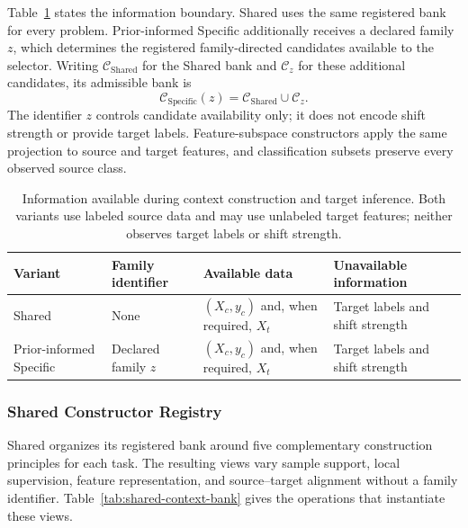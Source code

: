 Table~\ref{tab:context-information-interface} states the information boundary.
Shared uses the same registered bank for every problem.  Prior-informed
Specific additionally receives a declared family $z$, which determines the
registered family-directed candidates available to the selector.  Writing
$\mathcal C_{\mathrm{Shared}}$ for the Shared bank and $\mathcal C_z$ for these
additional candidates, its admissible bank is
\begin{equation}
  \mathcal C_{\mathrm{Specific}}(z)
  =\mathcal C_{\mathrm{Shared}}\cup\mathcal C_z.
  \label{eq:specific-context-bank}
\end{equation}
The identifier $z$ controls candidate availability only; it does not encode
shift strength or provide target labels.  Feature-subspace constructors apply
the same projection to source and target features, and classification subsets
preserve every observed source class.

\begin{table}[H]
  \caption{Information available during context construction and target
  inference.  Both variants use labeled source data and may use unlabeled
  target features; neither observes target labels or shift strength.}
  \label{tab:context-information-interface}
  \centering
  \footnotesize
  \setlength{\tabcolsep}{4pt}
  \begin{tabular}{@{}>{\raggedright\arraybackslash}p{} >{\raggedright\arraybackslash}p{} >{\raggedright\arraybackslash}p{} >{\raggedright\arraybackslash}p{}@{}}
    \toprule
    Variant & Family identifier & Available data & Unavailable information \\
    \midrule
    Shared
      & None
      & $(X_c,y_c)$ and, when required, $X_t$
      & Target labels and shift strength \\
    Prior-informed Specific
      & Declared family $z$
      & $(X_c,y_c)$ and, when required, $X_t$
      & Target labels and shift strength \\
    \bottomrule
  \end{tabular}
\end{table}

\subsubsection{Shared Constructor Registry}

Shared organizes its registered bank around five complementary construction
principles for each task.  The resulting views vary sample support, local
supervision, feature representation, and source--target alignment without a
family identifier.  Table~\ref{tab:shared-context-bank} gives the operations
that instantiate these views.

